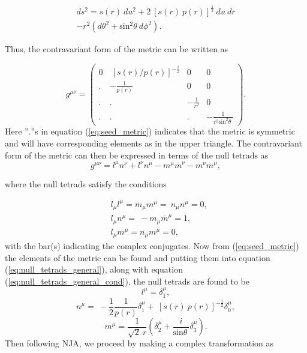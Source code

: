 \documentclass[12pt,a4paper,oneside]{book}
\newcommand{\eq}[2]{\begin{equation} \label{eq:#1} #2 \end{equation}}
\newcommand{\Eref}[1]{(\ref{eq:#1})}
\begin{document}
\begin{eqnarray}
\nonumber
ds^2=s(r)\ du^2+2\ {\left[s\left(r\right)\ p\left(r\right)\right]}^{\frac{1}{2}}\ du\ dr\\ 
-r^2\left(d{\theta }^2+{{\mathrm{sin}}^{\mathrm{2}} \theta \ }d{\phi }^2\right).
\end{eqnarray}

\noindent Thus, the contravariant form of the metric can be written as

\eq{seed_metric}{g^{\mu \nu }=\left( \begin{array}{cccc}
0 & \ {\left[s\left(r\right)/ p\left(r\right)\right]}^{-\frac{1}{2}} & 0 & 0 \\ 
. & -\frac{1}{p\left(r\right)} & 0 & 0 \\ 
. & . & -\frac{1}{r^2} & 0 \\ 
. & . & . & -\frac{1}{r^2{{\mathrm{sin}}^{\mathrm{2}} \theta \ }} \end{array}
\right).}
Here ''$.$''s in equation \Eref{seed_metric} indicates that the metric is symmetric and will have corresponding elements as in the upper triangle. The contravariant form of the metric can then be expressed in terms of the null tetrads as \cite{NJA_Orig, NJA_1, NJA_Revisited}
\eq{null_tetrads_general}{g^{\mu \nu }=l^{\mu }n^{\nu }+l^{\nu }n^{\mu }-m^{\mu }{\overline{m}}^{\nu }-m^{\nu }{\overline{m}}^{\mu },} 

\noindent where the null tetrads satisfy the conditions

\eq{null_tetrads_general_cond}{
\begin{split}
   &l_{\mu }l^{\mu }=m_{\mu }m^{\mu }=\ n_{\mu }n^{\mu }=0,
   \\&l_{\mu }n^{\mu }=\ -m_{\mu }{\overline{m}}^{\mu }=1,
   \\&l_{\mu }m^{\mu }=n_{\mu }m^{\mu }=0,
\end{split}
}
with the bar(s) indicating the complex conjugates. 
Now from \Eref{seed_metric} the elements of the metric can be found and putting them into equation \Eref{null_tetrads_general}, along with equation \Eref{null_tetrads_general_cond}, the null tetrads are found to be
\eq{}{l^{\mu }={\delta }^{\mu }_1,}
\eq{22}{ n^{\mu }=\ -\frac{1}{2}\frac{1}{p\left(r\right)}{\delta }^{\mu }_1+\ {\left[s\left(r\right)\ p\left(r\right)\right]}^{-\frac{1}{2}}{\delta }^{\mu }_0,}
\eq{}{ m^{\mu }=\frac{1}{\sqrt{2}\ r}\left({\delta }^{\mu }_2+\frac{i}{{\mathrm{sin} \theta \ }}{\delta }^{\mu }_3\right).}
Then following NJA, we proceed by making a complex transformation as
\end{document}
